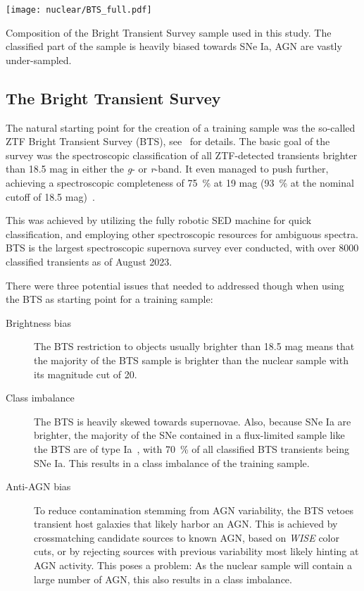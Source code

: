 \begin{marginfigure}
  \texttt{[image: nuclear/BTS\_full.pdf]}
  \caption[BTS Composition]{Composition of the Bright Transient Survey sample used in this study. The classified part of the sample is heavily biased towards SNe Ia, AGN are vastly under-sampled.}
\end{marginfigure}

\subsection{The Bright Transient Survey}\label{bts}
The natural starting point for the creation of a training sample was the so-called ZTF Bright Transient Survey (BTS), see~\cite{Fremling2020,Perley2020} for details. The basic goal of the survey was the spectroscopic classification of all ZTF-detected transients brighter than 18.5 mag in either the \textit{g}- or \textit{r}-band. It even managed to push further, achieving a spectroscopic completeness of \SI{75}{\percent} at 19 mag (\SI{93}{\percent} at the nominal cutoff of 18.5 mag)~\cite{Perley2020}.

This was achieved by utilizing the fully robotic SED machine for quick classification, and employing other spectroscopic resources for ambiguous spectra. BTS is the largest spectroscopic supernova survey ever conducted, with over 8000 classified transients as of August 2023.

There were three potential issues that needed to addressed though when using the BTS as starting point for a training sample:

\begin{description}
  \item[Brightness bias] The BTS restriction to objects usually brighter than 18.5 mag means that the majority of the BTS sample is brighter than the nuclear sample with its magnitude cut of 20.
  \item[Class imbalance] The BTS is heavily skewed towards supernovae. Also, because SNe Ia are brighter, the majority of the SNe contained in a flux-limited sample like the BTS are of type Ia~\cite{Perley2020}, with \SI{70}{\percent} of all classified BTS transients being SNe Ia. This results in a class imbalance of the training sample.
  \item[Anti-AGN bias] To reduce contamination stemming from AGN variability, the BTS vetoes transient host galaxies that likely harbor an AGN. This is achieved by crossmatching candidate sources to known AGN, based on \textit{WISE} color cuts, or by rejecting sources with previous variability most likely hinting at AGN activity. This poses a problem: As the nuclear sample will contain a large number of AGN, this also results in a class imbalance.
\end{description}

